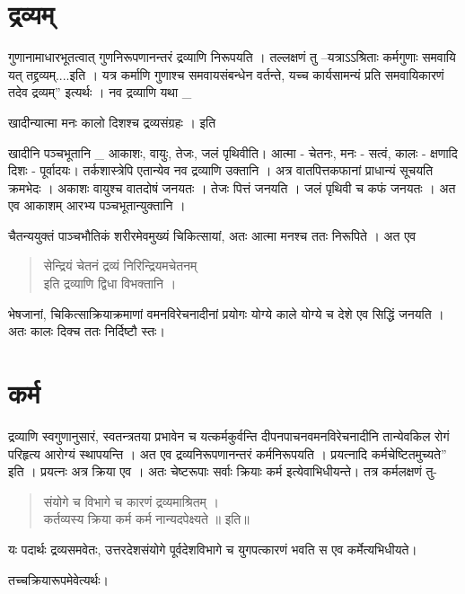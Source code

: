 \section*{द्रव्यम्}

गुणानामाधारभूतत्वात् गुणनिरूपणानन्तरं द्रव्याणि निरूपयति । तल्लक्षणं तु –यत्राऽऽश्रिताः कर्मगुणाः समवायि यत् तद्द्रव्यम्....इति । यत्र कर्माणि गुणाश्च समवायसंबन्धेन वर्तन्ते, यच्च कार्यसामन्यं प्रति समवायिकारणं तदेव द्रव्यम्” इत्यर्थः । नव द्रव्याणि यथा \_

खादीन्यात्मा मनः कालो दिशश्च द्रव्यसंग्रहः । इति

खादीनि पञ्चभूतानि \_ आकाशः, वायुः, तेजः, जलं पृथिवीति। आत्मा - चेतनः, मनः - सत्वं, कालः - क्षणादि दिशः - पूर्वादयः। तर्कशास्त्रेपि एतान्येव नव द्रव्याणि उक्तानि । अत्र वातपित्तकफानां प्राधान्यं सूचयति क्रमभेदः । अकाशः वायुश्च वातदोषं जनयतः । तेजः पित्तं जनयति । जलं पृथिवी च कफं जनयतः । अत एव आकाशम् आरभ्य पञ्चभूतान्युक्तानि ।

चैतन्ययुक्तं पाञ्चभौतिकं शरीरमेवमुख्यं चिकित्सायां, अतः आत्मा मनश्च ततः निरूपिते । अत एव
\begin{verse}
सेन्द्रियं चेतनं द्रव्यं निरिन्द्रियमचेतनम्\\
इति द्रव्याणि द्विधा विभक्तानि ।
\end{verse}
भेषजानां, चिकित्साक्रियाक्रमाणां वमनविरेचनादीनां प्रयोगः योग्ये काले योग्ये च देशे एव सिद्धिं जनयति । अतः कालः दिक्च ततः निर्दिष्टौ स्तः।

\section*{कर्म} 

द्रव्याणि स्वगुणानुसारं, स्वतन्त्रतया प्रभावेन च यत्कर्मकुर्वन्ति दीपनपाचनवमनविरेचनादीनि तान्येवकिल रोगं परिहृत्य आरोग्यं स्थापयन्ति । अत एव द्रव्यनिरूपणानन्तरं कर्मनिरूपयति । प्रयत्नादि कर्मचेष्टितमुच्यते” इति । प्रयत्नः अत्र क्रिया एव । अतः चेष्टरूपाः सर्वाः क्रियाः कर्म इत्येवाभिधीयन्ते। तत्र कर्मलक्षणं तु-
\begin{verse}
संयोगे च विभागे च कारणं द्रव्यमाश्रितम् ।\\
कर्तव्यस्य क्रिया कर्म कर्म नान्यदपेक्ष्यते ॥ इति॥
\end{verse}
यः पदार्थः द्रव्यसमवेतः, उत्तरदेशसंयोगे पूर्वदेशविभागे च युगपत्कारणं भवति स एव कर्मेत्यभिधीयते।

तच्चक्रियारूपमेवेत्यर्थः।

